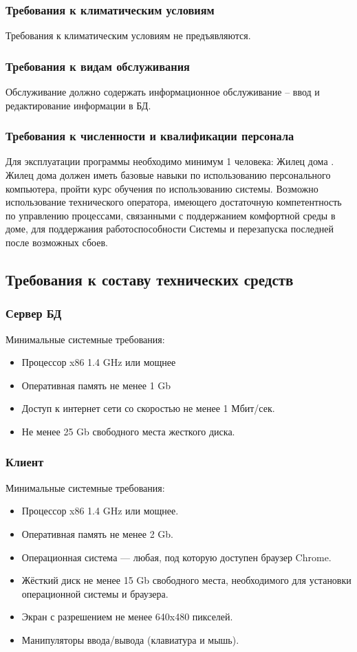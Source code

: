     \subsubsection{Требования к климатическим условиям}
      Требования к климатическим условиям не предъявляются.
    \subsubsection{Требования к видам обслуживания}
      Обслуживание должно содержать информационное обслуживание – ввод и редактирование информации в БД.
    \subsubsection{Требования к численности и квалификации персонала}
      Для эксплуатации программы необходимо минимум 1 человека: Жилец дома .
Жилец дома должен иметь базовые навыки по использованию персонального компьютера, пройти курс обучения по использованию системы.
Возможно использование технического оператора, имеющего достаточную компетентность по управлению процессами, связанными с поддержанием комфортной среды в доме, для поддержания работоспособности Системы и перезапуска последней после возможных сбоев.
  \subsection{Требования к составу технических средств}
    \subsubsection{Сервер БД}
      Минимальные системные требования:
      \begin{itemize}
        \item Процессор x86 1.4 GHz или мощнее
        \item Оперативная память не менее 1 Gb
        \item Доступ к интернет сети со скоростью не менее 1 Мбит/сек. 
        \item Не менее 25 Gb свободного места жесткого диска.
      \end{itemize}
    \subsubsection{Клиент}
      Минимальные системные требования:
      \begin{itemize}
        \item Процессор x86 1.4 GHz или мощнее.
        \item Оперативная память не менее 2 Gb.
        \item Операционная система — любая, под которую доступен браузер Chrome.
        \item Жёсткий диск не менее 15 Gb свободного места, необходимого для установки операционной системы и браузера.
        \item Экран с разрешением не менее 640x480 пикселей.
        \item Манипуляторы ввода/вывода (клавиатура и мышь).
      \end{itemize}
